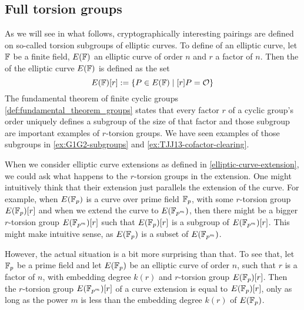 \subsection{Full torsion groups}
\label{sec:full-torsion} As we will see in what follows, cryptographically interesting pairings are defined on so-called torsion subgroups of elliptic curves. To define  of an elliptic curve, let $\mathbb{F}$ be a finite field, $E(\mathbb{F})$ an elliptic curve of order $n$ and $r$ a factor of $n$. Then the  of the elliptic curve $E(\mathbb{F})$ is defined as the set
\begin{equation}
\label{def:torsion_group}
E(\mathbb{F})[r]:= \{P\in E(\mathbb{F})\;|\; [r]P = \mathcal{O}\}
\end{equation} 
The fundamental theorem of finite cyclic groups \ref{def:fundamental_theorem_groups} states that every factor $r$ of a cyclic group's order uniquely defines a subgroup of the size of that factor and those subgroup are important examples of $r$-torsion groups. We have seen examples of those subgroups in \ref{ex:G1G2-subgroups} and \ref{ex:TJJ13-cofactor-clearing}.

When we consider elliptic curve extensions as defined in \ref{elliptic-curve-extension}, we could ask what happens to the $r$-torsion groups in the extension. One might intuitively think that their extension just parallels the extension of the curve. For example, when $E(\mathbb{F}_p)$ is a curve over prime field $\mathbb{F}_p$, with some $r$-torsion group $E(\mathbb{F}_p)[r]$ and when we extend the curve to $E(\mathbb{F}_{p^m})$, then there might be a bigger $r$-torsion group $E(\mathbb{F}_{p^m})[r]$ such that $E(\mathbb{F}_p)[r]$ is a subgroup of $E(\mathbb{F}_{p^m})[r]$. This might make intuitive sense, as $E(\mathbb{F}_p)$ is a subset of $E(\mathbb{F}_{p^m})$. 

However, the actual situation is a bit more surprising than that. To see that, let $\mathbb{F}_p$ be a prime field and let $E(\mathbb{F}_p)$ be an elliptic curve of order $n$, such that $r$ is a factor of $n$, with embedding degree $k(r)$ and $r$-torsion group $E(\mathbb{F}_p)[r]$. Then the $r$-torsion group $E(\mathbb{F}_{p^m})[r]$ of a curve extension is equal to $E(\mathbb{F}_p)[r]$, only as long as the power $m$ is less than the embedding degree $k(r)$ of $E(\mathbb{F}_p)$. 

